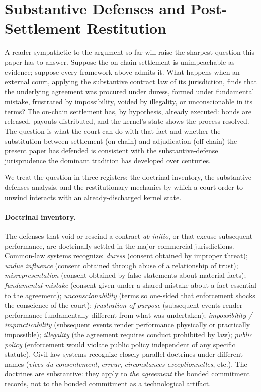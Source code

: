 \documentclass[11pt,a4paper]{article}
\theoremstyle{remark}
\begin{document}
\section{Substantive Defenses and Post-Settlement Restitution}
\label{sec:defeasance}

A reader sympathetic to the argument so far will raise the
sharpest question this paper has to answer. Suppose the on-chain
settlement is unimpeachable as evidence; suppose every framework
above admits it. What happens when an external court, applying
the substantive contract law of its jurisdiction, finds that the
underlying agreement was procured under duress, formed under
fundamental mistake, frustrated by impossibility, voided by
illegality, or unconscionable in its terms? The on-chain
settlement has, by hypothesis, already executed: bonds are
released, payouts distributed, and the kernel's state shows the
process resolved. The question is what the court can do with
that fact and whether the substitution between settlement
(on-chain) and adjudication (off-chain) the present paper has
defended is consistent with the substantive-defense
jurisprudence the dominant tradition has developed over centuries.

We treat the question in three registers: the doctrinal
inventory, the substantive-defenses analysis, and the
restitutionary mechanics by which a court order to unwind
interacts with an already-discharged kernel state.

\paragraph{Doctrinal inventory.}
The defenses that void or rescind a contract \emph{ab initio},
or that excuse subsequent performance, are doctrinally settled
in the major commercial jurisdictions. Common-law systems
recognize: \emph{duress} (consent obtained by improper threat);
\emph{undue influence} (consent obtained through abuse of a
relationship of trust); \emph{misrepresentation} (consent
obtained by false statements about material facts);
\emph{fundamental mistake} (consent given under a shared mistake
about a fact essential to the agreement);
\emph{unconscionability} (terms so one-sided that enforcement
shocks the conscience of the court);
\emph{frustration of purpose} (subsequent events render
performance fundamentally different from what was undertaken);
\emph{impossibility / impracticability} (subsequent events
render performance physically or practically impossible);
\emph{illegality} (the agreement requires conduct prohibited by
law); \emph{public policy} (enforcement would violate public
policy independent of any specific statute). Civil-law systems
recognize closely parallel doctrines under different names
(\emph{vices du consentement}, \emph{erreur},
\emph{circonstances exceptionnelles}, etc.). The doctrines are
substantive: they apply to \emph{the agreement} the bonded
commitment records, not to the bonded commitment as a
technological artifact.
\end{document}
